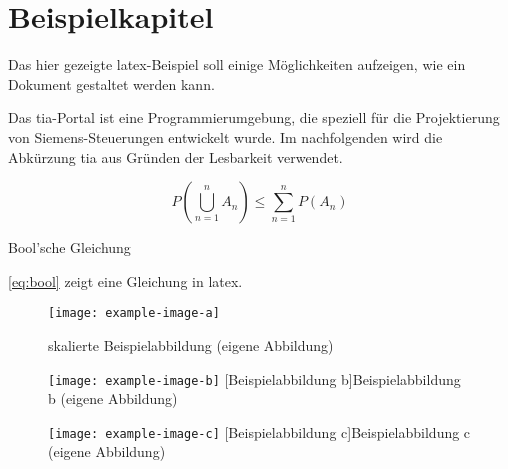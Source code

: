 \chapter{Beispielkapitel}\label{chap:example} %

\lipsum[]

Das hier gezeigte \gls{latex}-Beispiel soll einige Möglichkeiten aufzeigen, wie ein Dokument gestaltet werden kann.

Das \acrfull{tia}-Portal ist eine Programmierumgebung, die speziell für die Projektierung von Siemens-Steuerungen entwickelt wurde. Im nachfolgenden wird die Abkürzung \acrshort{tia} aus Gründen der Lesbarkeit verwendet.

\begin{mycapequ}[!ht]
    \begin{equation}
        {P(\bigcup_{n=1}^n A_n) \leq \sum_{n=1}^n P(A_n)}
        \label{eq:bool} %
    \end{equation}
    \caption{Bool'sche Gleichung}
\end{mycapequ}

\noindent \cref{eq:bool} zeigt eine Gleichung in \gls{latex}.

\clearpage

\begin{figure}[!ht]
    \centering
    \texttt{[image: example-image-a]}
    \captionsetup{width=1.0\textwidth}
    \caption[skalierte Beispielabbildung]{skalierte Beispielabbildung (eigene Abbildung)}
    \label{fig:scaledexampleimagea} %
\end{figure}

\begin{figure}[!ht]
\centering
    \begin{minipage}[c]{.475\textwidth}
    \centering
        \texttt{[image: example-image-b]}
        [Beispielabbildung b]{Beispielabbildung b (eigene Abbildung)}
        \label{fig:horizontalalignedimageb} %
    \end{minipage}\hspace{.025\textwidth}
    \begin{minipage}[c]{.475\textwidth}
        \centering
        \texttt{[image: example-image-c]}
        [Beispielabbildung c]{Beispielabbildung c (eigene Abbildung)}
        \label{fig:horizontalalignedimagec} %
    \end{minipage}
\end{figure}

